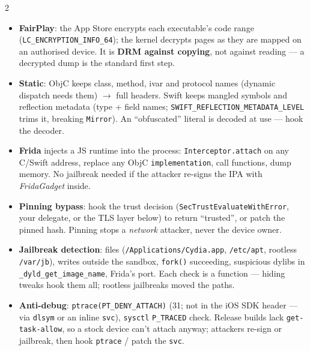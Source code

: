 \documentclass[8pt]{extarticle}
\newcommand\ct[1]{\texttt{#1}}
\newcommand\hd[1]{\par\vspace{3pt}\noindent{\bfseries\color{sheetBlue}#1}\par\vspace{1pt}}
\begin{document}
\begin{multicols}{2}
\raggedright{}

\hd{How it works}
\begin{itemize}
  \item \textbf{FairPlay}: the App Store encrypts each executable's code range
        (\ct{LC\_ENCRYPTION\_INFO\_64}); the kernel decrypts pages as they are mapped on an
        authorised device. It is \textbf{DRM against copying}, not against reading — a decrypted
        dump is the standard first step.
  \item \textbf{Static}: ObjC keeps class, method, ivar and protocol names (dynamic dispatch needs
        them) $\to$ full headers. Swift keeps mangled symbols and reflection metadata
        (type + field names; \ct{SWIFT\_REFLECTION\_METADATA\_LEVEL} trims it, breaking
        \ct{Mirror}). An ``obfuscated'' literal is decoded at use — hook the decoder.
  \item \textbf{Frida} injects a JS runtime into the process: \ct{Interceptor.attach} on any
        C/Swift address, replace any ObjC \ct{implementation}, call functions, dump memory.
        No jailbreak needed if the attacker re-signs the IPA with \emph{FridaGadget} inside.
  \item \textbf{Pinning bypass}: hook the trust decision (\ct{SecTrustEvaluateWithError}, your
        delegate, or the TLS layer below) to return ``trusted'', or patch the pinned hash.
        Pinning stops a \emph{network} attacker, never the device owner.
  \item \textbf{Jailbreak detection}: files (\ct{/Applications/Cydia.app}, \ct{/etc/apt},
        rootless \ct{/var/jb}), writes outside the sandbox, \ct{fork()} succeeding, suspicious
        dylibs in \ct{\_dyld\_get\_image\_name}, Frida's port. Each check is a function —
        hiding tweaks hook them all; rootless jailbreaks moved the paths.
  \item \textbf{Anti-debug}: \ct{ptrace(PT\_DENY\_ATTACH)} (31; not in the iOS SDK header —
        via \ct{dlsym} or an inline \ct{svc}), \ct{sysctl} \ct{P\_TRACED} check. Release builds
        lack \ct{get-task-allow}, so a stock device can't attach anyway; attackers re-sign or
        jailbreak, then hook \ct{ptrace} / patch the \ct{svc}.
\end{itemize}

\columnbreak


\end{multicols}
\end{document}
